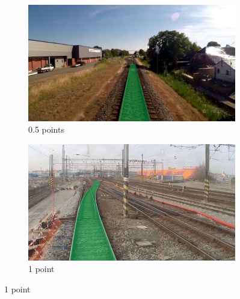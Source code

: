 \begin{figure}[H]
    \centering
    \begin{subfigure}[b]{0.48\textwidth}
        \centering
        \includegraphics[width=\textwidth]{PICs/usedDatasets/0,5punkte.jpg}
        \caption{0.5 points}
    \end{subfigure}
    \hfill
    \begin{subfigure}[b]{0.48\textwidth}
        \centering
        \includegraphics[width=\textwidth]{PICs/usedDatasets/1punkt.jpg}
        \caption{1 point}
    \end{subfigure}
    
    \vspace{0.5cm} %


\end{figure}

